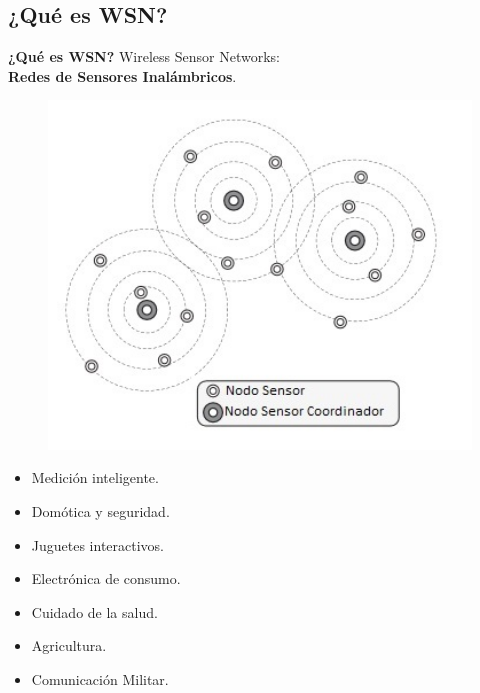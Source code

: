 \documentclass[aspectratio=43, handout]{beamer}
\begin{document}
\subsection[WSN]{¿Qué es WSN?}
\begin{frame}{\textbf{\LARGE{¿Qué es WSN?}}}
\fontsize{14pt}{14}\selectfont
\noindent Wireless Sensor Networks:\\
\textbf{Redes de Sensores Inalámbricos}.
\begin{minipage}[c]{1.0\linewidth}
	\begin{minipage}[c]{0.4\linewidth}
		\begin{figure}[H]			
		\includegraphics[width=1.2\textwidth]{./imagenes/WSN.jpg}
		\end{figure}	  	  	
	\end{minipage}
	\begin{minipage}[c]{0.58\linewidth}
			\vspace{20px}
		\begin{itemize}
			\item Medición inteligente.
			\vspace{5px}
			\item Domótica y seguridad.
			\vspace{5px}
			\item Juguetes interactivos.
			\vspace{5px}
			\item Electrónica de consumo.
			\vspace{5px}
			\item Cuidado de la salud.
			\vspace{5px}
			\item Agricultura.
			\vspace{5px}
			\item Comunicación Militar.
			\vspace{5px}
		\end{itemize}
\end{minipage}
\end{minipage}
\end{frame}
\end{document}
